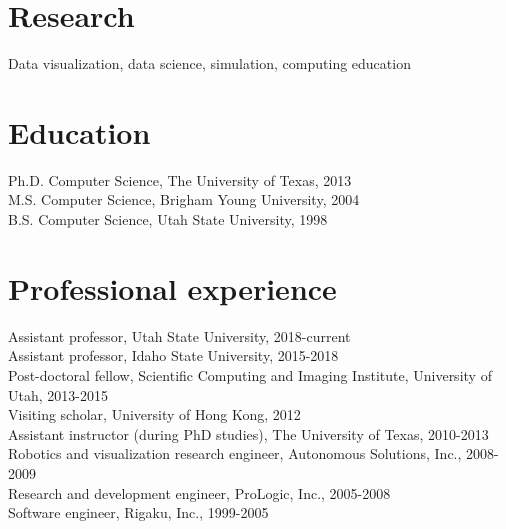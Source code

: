 \documentclass[margin,line]{res}
\begin{document}
\begin{resume}
\section{\sc Research}

Data visualization, data science, simulation, computing education

\section{\sc Education}

Ph.D. Computer Science, The University of Texas, 2013\\
M.S. Computer Science, Brigham Young University, 2004\\
B.S. Computer Science, Utah State University, 1998\\

\section{\sc Professional experience}

Assistant professor, Utah State University, 2018-current\\
Assistant professor, Idaho State University, 2015-2018\\
Post-doctoral fellow, Scientific Computing and Imaging
Institute, University of Utah, 2013-2015\\
Visiting scholar, University of Hong Kong, 2012\\
Assistant instructor (during PhD studies), The University of Texas, 2010-2013\\
Robotics and visualization research engineer, Autonomous Solutions, Inc., 2008-2009\\
Research and development engineer, ProLogic, Inc., 2005-2008 \\
Software engineer, Rigaku, Inc., 1999-2005 \\


\end{resume}
\end{document}
